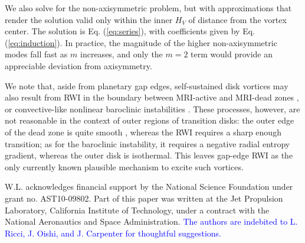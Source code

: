\documentclass[apj]{emulateapj}
\def\blue#1{\textcolor{blue}{#1}}
\newcommand{\Eq}[1]{Eq. (\ref{#1})}
\newcommand{\eq}[1]{\Eq{#1}}
\begin{document}
We also solve for the non-axisymmetric problem, but with
approximations that render the solution valid only within 
the inner $H_V$ of distance from the vortex center. The solution is
\eq{eq:series}, with coefficients given by \eq{eq:induction}. In practice, the magnitude
of the higher non-axisymmetric modes fall fast as $m$ increases, and 
only the $m=2$ term would provide an appreciable deviation from
axisymmetry. 

We note that, aside from planetary gap edges, self-sustained disk
vortices may also result from RWI in the boundary between MRI-active and MRI-dead zones \citep{Varniere-Tagger06,Lyra08,Lyra09a,Lyra-MacLow12}, or
convective-like nonlinear baroclinic instabilities \citep{Klahr-Bodenheimer03,Klahr04,Petersen07a,Petersen07b,Lesur-Papaloizou10,Lyra-Klahr11,Raettig13}. 
These processes, however, are not reasonable in the context of outer
regions of transition disks: the outer edge of the dead zone is quite smooth
\citep{Dzyurkevich13,Landry13}, whereas the RWI requires a 
sharp enough transition; as for the baroclinic instability, it
requires a negative radial entropy gradient, whereas the outer disk is
isothermal. This leaves gap-edge RWI as the only currently known plausible mechanism to excite such vortices. 

\acknowledgments W.L. acknowledges financial support by the National Science
Foundation under grant no. AST10-09802. Part of this paper was written
at the Jet Propulsion Laboratory, California Institute of Technology, under a contract with the
National Aeronautics and Space Administration. \blue{The authors are
  indebited to L. Ricci,  J. Oishi, and J. Carpenter for thoughtful suggestions.} 
\end{document}
